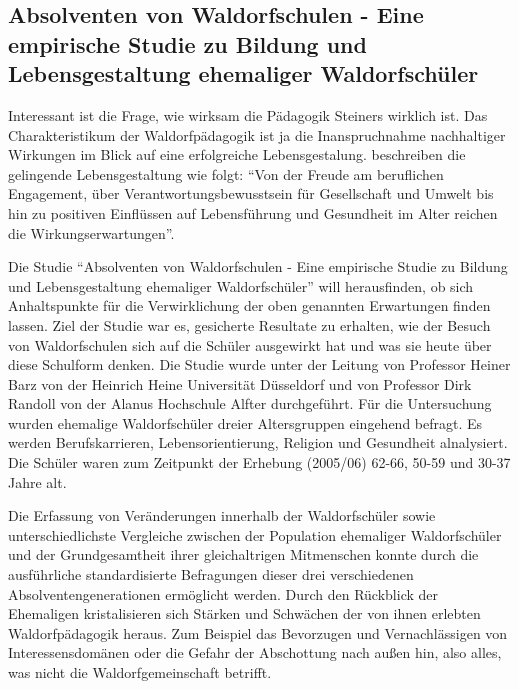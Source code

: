 
\subsection{Absolventen von Waldorfschulen - Eine empirische Studie zu Bildung und Lebensgestaltung ehemaliger Waldorfschüler} %
\label{Studie}

Interessant ist die Frage, wie wirksam die Pädagogik Steiners wirklich ist. Das Charakteristikum der Waldorfpädagogik ist ja die Inanspruchnahme nachhaltiger Wirkungen im Blick auf eine erfolgreiche Lebensgestalung.
\citet[][S. 13]{randoll07} beschreiben die gelingende Lebensgestaltung wie folgt: \enquote{Von der Freude am beruflichen Engagement, über Verantwortungsbewusstsein für Gesellschaft und Umwelt bis hin zu positiven Einflüssen auf Lebensführung und Gesundheit im Alter reichen die Wirkungserwartungen}.

Die Studie \enquote{Absolventen von Waldorfschulen - Eine empirische Studie zu Bildung und Lebensgestaltung ehemaliger Waldorfschüler} will herausfinden, ob sich Anhaltspunkte für die Verwirklichung der oben genannten Erwartungen finden lassen.
Ziel der Studie war es, gesicherte Resultate zu erhalten, wie der Besuch von Waldorfschulen sich auf die Schüler ausgewirkt hat und was sie heute über diese Schulform denken.
Die Studie wurde unter der Leitung von Professor Heiner Barz von der Heinrich Heine Universität Düsseldorf und von Professor Dirk Randoll von der Alanus Hochschule Alfter durchgeführt. 
Für die Untersuchung wurden ehemalige Waldorfschüler dreier Altersgruppen eingehend befragt. 
Es werden Berufskarrieren, Lebensorientierung, Religion und Gesundheit alnalysiert. 
Die Schüler waren zum Zeitpunkt der Erhebung (2005/06) 62-66, 50-59 und 30-37 Jahre alt.   \citep[Vgl.][]{randoll07, paschen10}

Die Erfassung von Veränderungen innerhalb der Waldorfschüler sowie unterschiedlichste Vergleiche zwischen der Population ehemaliger Waldorfschüler und der Grundgesamtheit ihrer gleichaltrigen Mitmenschen konnte durch die ausführliche standardisierte Befragungen dieser drei verschiedenen Absolventengenerationen ermöglicht werden. 
Durch den Rückblick der Ehemaligen kristalisieren sich Stärken und Schwächen der von ihnen erlebten Waldorfpädagogik heraus.
Zum Beispiel das Bevorzugen und Vernachlässigen von Interessensdomänen oder die Gefahr der Abschottung nach außen hin, also alles, was nicht die Waldorfgemeinschaft betrifft.  \citep[Vgl.][S. 12]{randoll07}


